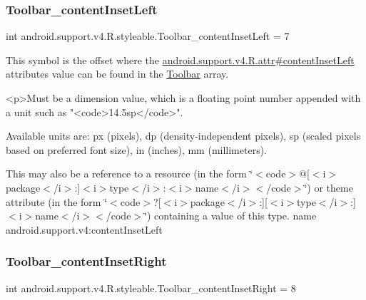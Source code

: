 \subsubsection{\texorpdfstring{Toolbar\+\_\+content\+Inset\+Left}{Toolbar\_contentInsetLeft}}
{\footnotesize\ttfamily int android.\+support.\+v4.\+R.\+styleable.\+Toolbar\+\_\+content\+Inset\+Left = 7\hspace{0.3cm}{\ttfamily [static]}}

This symbol is the offset where the \hyperlink{classandroid_1_1support_1_1v4_1_1R_1_1attr_ae2b4db4a6417ce171035f616b2fa4d20}{android.\+support.\+v4.\+R.\+attr\#content\+Inset\+Left} attribute\textquotesingle{}s value can be found in the \hyperlink{classandroid_1_1support_1_1v4_1_1R_1_1styleable_a211358a2f951023c7735caea0fb5ae04}{Toolbar} array.

\begin{DoxyVerb}      <p>Must be a dimension value, which is a floating point number appended with a unit such as "<code>14.5sp</code>".
\end{DoxyVerb}
 Available units are\+: px (pixels), dp (density-\/independent pixels), sp (scaled pixels based on preferred font size), in (inches), mm (millimeters). 

This may also be a reference to a resource (in the form \char`\"{}$<$code$>$@\mbox{[}$<$i$>$package$<$/i$>$\+:\mbox{]}$<$i$>$type$<$/i$>$\+:$<$i$>$name$<$/i$>$$<$/code$>$\char`\"{}) or theme attribute (in the form \char`\"{}$<$code$>$?\mbox{[}$<$i$>$package$<$/i$>$\+:\mbox{]}\mbox{[}$<$i$>$type$<$/i$>$\+:\mbox{]}$<$i$>$name$<$/i$>$$<$/code$>$\char`\"{}) containing a value of this type.  name android.\+support.\+v4\+:content\+Inset\+Left \mbox{\label{classandroid_1_1support_1_1v4_1_1R_1_1styleable_aa53bacd1f9f065115238222bc4ca4f5d}} 
\subsubsection{\texorpdfstring{Toolbar\+\_\+content\+Inset\+Right}{Toolbar\_contentInsetRight}}
{\footnotesize\ttfamily int android.\+support.\+v4.\+R.\+styleable.\+Toolbar\+\_\+content\+Inset\+Right = 8\hspace{0.3cm}{\ttfamily [static]}}

